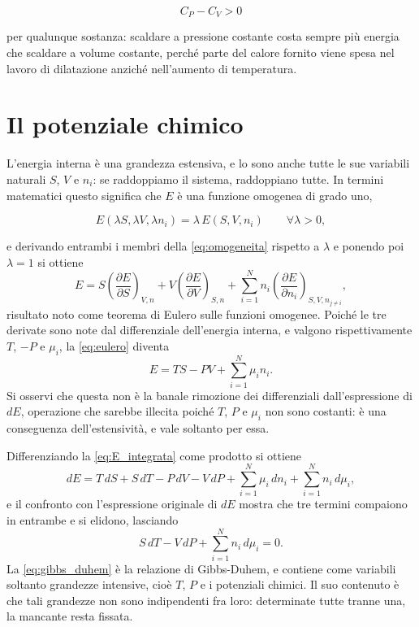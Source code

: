 \begin{equation}
    C_P - C_V > 0
    \label{eq:disuguaglianza_calori}
\end{equation}

per qualunque sostanza: scaldare a pressione costante costa sempre più energia che scaldare a volume costante, perché parte del calore fornito viene spesa nel lavoro di dilatazione anziché nell'aumento di temperatura.

\section{Il potenziale chimico}

L'energia interna è una grandezza estensiva, e lo sono anche tutte le sue variabili naturali $S$, $V$ e $n_i$: se raddoppiamo il sistema, raddoppiano tutte.
In termini matematici questo significa che $E$ è una funzione omogenea di grado uno,

\begin{equation}
    E(\lambda S, \lambda V, \lambda n_i) = \lambda\,E(S,V,n_i)
    \qquad \forall \lambda > 0 ,
    \label{eq:omogeneita}
\end{equation}

e derivando entrambi i membri della \eqref{eq:omogeneita} rispetto a $\lambda$ e ponendo poi $\lambda = 1$ si ottiene
\begin{equation}
    E = S\left(\frac{\partial E}{\partial S}\right)_{V,n} + V\left(\frac{\partial E}{\partial V}\right)_{S,n} + \sum_{i=1}^{N} n_i \left(\frac{\partial E}{\partial n_i}\right)_{S,V,n_{j\neq i}} ,
    \label{eq:eulero}
\end{equation}
risultato noto come teorema di Eulero sulle funzioni omogenee.
Poiché le tre derivate sono note dal differenziale dell'energia interna, e valgono rispettivamente $T$, $-P$ e $\mu_i$, la \eqref{eq:eulero} diventa
\begin{equation}
    E = TS - PV + \sum_{i=1}^{N}\mu_i n_i .
    \label{eq:E_integrata}
\end{equation}
Si osservi che questa non è la banale rimozione dei differenziali dall'espressione di $dE$, operazione che sarebbe illecita poiché $T$, $P$ e $\mu_i$ non sono costanti: è una conseguenza dell'estensività, e vale soltanto per essa.

Differenziando la \eqref{eq:E_integrata} come prodotto si ottiene
\begin{equation}
    dE = T\,dS + S\,dT - P\,dV - V\,dP + \sum_{i=1}^{N}\mu_i\,dn_i + \sum_{i=1}^{N} n_i\,d\mu_i ,
    \label{eq:dE_differenziata}
\end{equation}
e il confronto con l'espressione originale di $dE$ mostra che tre termini compaiono in entrambe e si elidono, lasciando
\begin{equation}
    S\,dT - V\,dP + \sum_{i=1}^{N} n_i\,d\mu_i = 0 .
    \label{eq:gibbs_duhem}
\end{equation}
La \eqref{eq:gibbs_duhem} è la relazione di Gibbs-Duhem, e contiene come variabili soltanto grandezze intensive, cioè $T$, $P$ e i potenziali chimici.
Il suo contenuto è che tali grandezze non sono indipendenti fra loro: determinate tutte tranne una, la mancante resta fissata.

